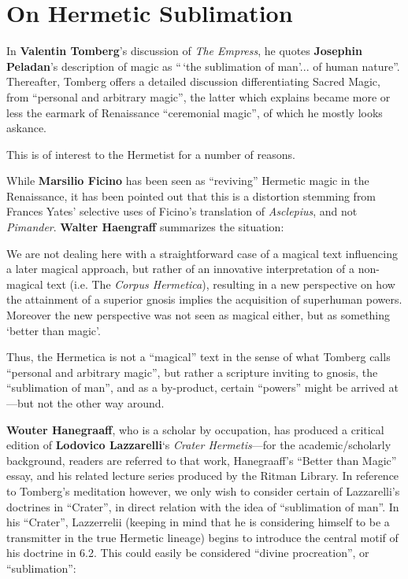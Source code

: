 \section{On Hermetic Sublimation}

In \textbf{Valentin Tomberg}'s discussion of \textit{The Empress}, he quotes \textbf{Josephin Peladan}'s description of magic as ``\,`the sublimation of man'... of human nature''. Thereafter, Tomberg offers a detailed discussion differentiating Sacred Magic, from ``personal and arbitrary magic'', the latter which explains became more or less the earmark of Renaissance ``ceremonial magic'', of which he mostly looks askance.

This is of interest to the Hermetist for a number of reasons.

While \textbf{Marsilio Ficino} has been seen as ``reviving'' Hermetic magic in the Renaissance, it has been pointed out that this is a distortion stemming from Frances Yates' selective uses of Ficino's translation of \emph{Asclepius}, and not \emph{Pimander}. \textbf{Walter Haengraff} summarizes the situation:

\begin{quotex}
We are not dealing here with a straightforward case of a magical text influencing a later magical approach, but rather of an innovative interpretation of a non-magical text (i.e. The \emph{Corpus Hermetica}), resulting in a new perspective on how the attainment of a superior gnosis implies the acquisition of superhuman powers. Moreover the new perspective was not seen as magical either, but as something `better than magic'.
\end{quotex}


Thus, the Hermetica is not a ``magical'' text in the sense of what Tomberg calls ``personal and arbitrary magic'', but rather a scripture inviting to gnosis, the ``sublimation of man'', and as a by-product, certain ``powers'' might be arrived at---but not the other way around.

\textbf{Wouter Hanegraaff}, who is a scholar by occupation, has produced a critical edition of \textbf{Lodovico Lazzarelli}`s \emph{Crater Hermetis}---for the academic/scholarly background, readers are referred to that work, Hanegraaff's ``Better than Magic'' essay, and his related lecture series produced by the Ritman Library. In reference to Tomberg's meditation however, we only wish to consider certain of Lazzarelli's doctrines in ``Crater'', in direct relation with the idea of ``sublimation of man''. In his ``Crater'', Lazzerrelii (keeping in mind that he is considering himself to be a transmitter in the true Hermetic lineage) begins to introduce the central motif of his doctrine in 6.2. This could easily be considered ``divine procreation'', or ``sublimation'':

